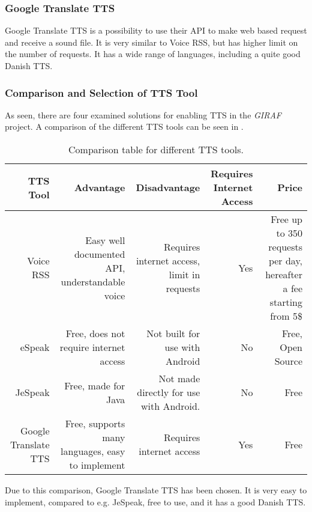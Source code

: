 \subsubsection{Google Translate TTS}
Google Translate TTS is a possibility to use their API to make web based request and receive a sound file. It is very similar to Voice RSS, but has higher limit on the number of requests. It has a wide range of languages, including a quite good Danish TTS. 

\subsubsection{Comparison and Selection of TTS Tool}
As seen, there are four examined solutions for enabling TTS in the \textit{GIRAF} project. A comparison of the different TTS tools can be seen in .


\begin{table}[h]
    \begin{tabularx}{\textwidth}{|R|R|R|R|R|}
    \hline
    \textbf{TTS Tool}             &\textbf{Advantage}                                   &\textbf{Disadvantage}                               & \textbf{Requires Internet Access} &\textbf{Price}                                                      \\ \hline
    Voice RSS            & Easy well documented API, understandable voice    & Requires internet access, limit in requests & Yes                     & Free up to 350 requests per day, hereafter a fee starting from 5\$ \\ \hline
    eSpeak               & Free, does not require internet access            & Not built for use with Android             & No                      & Free, Open Source                                          \\ \hline
    JeSpeak              & Free, made for Java                             & Not made directly for use with Android.    & No                      & Free                                                       \\ \hline
    Google Translate TTS & Free, supports many languages, easy to implement & Requires internet access                    & Yes                     & Free                                                       \\ \hline
    \end{tabularx}
    \caption{Comparison table for different TTS tools.}
    \label{tab:ttscomp}
\end{table}

Due to this comparison, Google Translate TTS has been chosen. It is very easy to implement, compared to e.g. JeSpeak, free to use, and it has a good Danish TTS.
